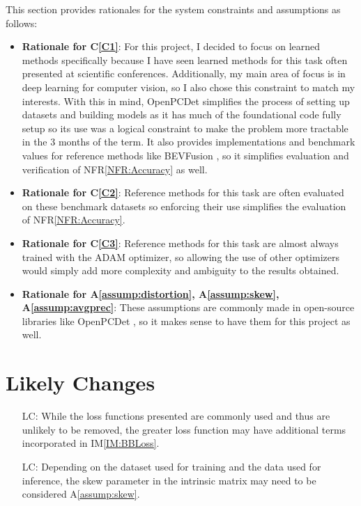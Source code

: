 \documentclass[12pt]{article}
\newcommand{\aref}[1]{A\ref{#1}}
\newcommand{\iref}[1]{IM\ref{#1}}
\newcommand{\cref}[1]{C\ref{#1}}
\newcommand{\nfrref}[1]{NFR\ref{#1}}
\newcounter{lcnum} %
\begin{document}
This section provides rationales for the system constraints and assumptions as follows:
\begin{itemize}
  \item \textbf{Rationale for \cref{C1}}: For this project, I decided to focus on learned methods specifically because I have seen learned methods for this task often presented at scientific conferences. 
  Additionally, my main area of focus is in deep learning for computer vision, so I also chose this constraint to match my interests. With this in mind, OpenPCDet \cite{openpcdet2020} simplifies the process of setting up datasets and 
  building models as it has much of the foundational code fully setup so its use was a logical constraint to make the problem more tractable in the 3 months of the term. It also provides implementations and benchmark
  values for reference methods like BEVFusion \cite{liang2022bevfusion}, so it simplifies evaluation and verification of \nfrref{NFR:Accuracy} as well.
  \item \textbf{Rationale for \cref{C2}}: Reference methods for this task are often evaluated on these benchmark datasets so enforcing their use simplifies the evaluation of \nfrref{NFR:Accuracy}.
  \item \textbf{Rationale for \cref{C3}}: Reference methods for this task are almost always trained with the ADAM optimizer, so allowing the use of other optimizers would simply add more complexity and ambiguity to the results obtained.
  \item \textbf{Rationale for \aref{assump:distortion}, \aref{assump:skew}, \aref{assump:avgprec}}: These assumptions are commonly made in open-source libraries like OpenPCDet \cite{openpcdet2020}, so it makes sense to have them for this project as well.
\end{itemize}

\section{Likely Changes}    

\noindent \begin{itemize}
\item[LC\refstepcounter{lcnum}\thelcnum\label{LC:Loss}:] While the loss functions presented are commonly used and thus are unlikely to be removed, the greater loss function may have additional terms incorporated in \iref{IM:BBLoss}.
\item[LC\refstepcounter{lcnum}\thelcnum\label{LC:Skew}:] Depending on the dataset used for training and the data used for inference, the skew parameter in the intrinsic matrix may need to be considered \aref{assump:skew}.
\end{itemize}
\end{document}
